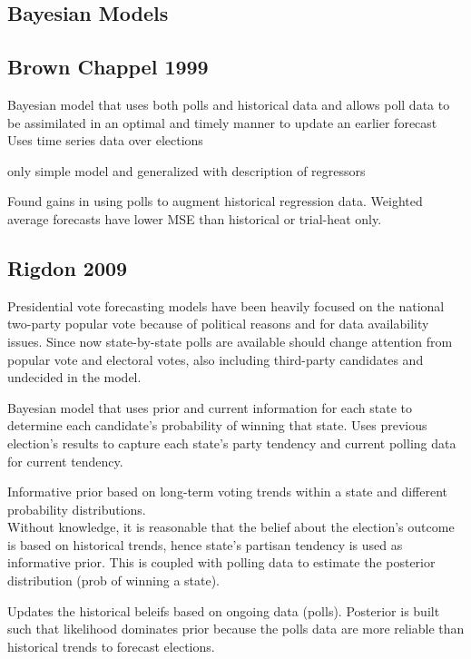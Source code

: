 \documentclass[
  12pt]{article}
\begin{document}
\hypertarget{bayesian-models}{%
\subsection{Bayesian Models}\label{bayesian-models}}

\hypertarget{brown-chappel-1999}{%
\subsection{Brown Chappel 1999}\label{brown-chappel-1999}}

Bayesian model that uses both polls and historical data and allows poll
data to be assimilated in an optimal and timely manner to update an
earlier forecast Uses time series data over elections

only simple model and generalized with description of regressors

Found gains in using polls to augment historical regression data.
Weighted average forecasts have lower MSE than historical or trial-heat
only.

\hypertarget{rigdon-2009}{%
\subsection{Rigdon 2009}\label{rigdon-2009}}

Presidential vote forecasting models have been heavily focused on the
national two-party popular vote because of political reasons and for
data availability issues. Since now state-by-state polls are available
should change attention from popular vote and electoral votes, also
including third-party candidates and undecided in the model.

Bayesian model that uses prior and current information for each state to
determine each candidate's probability of winning that state. Uses
previous election's results to capture each state's party tendency and
current polling data for current tendency.

Informative prior based on long-term voting trends within a state and
different probability distributions.\\
Without knowledge, it is reasonable that the belief about the election's
outcome is based on historical trends, hence state's partisan tendency
is used as informative prior. This is coupled with polling data to
estimate the posterior distribution (prob of winning a state).

Updates the historical beleifs based on ongoing data (polls). Posterior
is built such that likelihood dominates prior because the polls data are
more reliable than historical trends to forecast elections.
\end{document}
